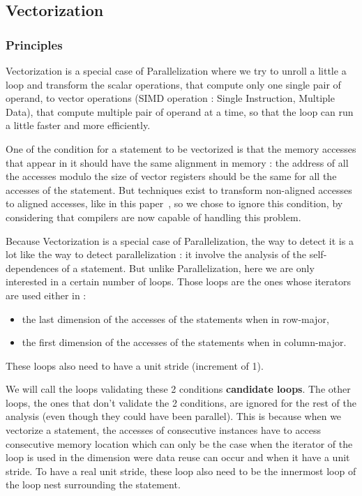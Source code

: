 \documentclass[paper=a4, fontsize=11.5pt]{scrartcl}
\numberwithin{equation}{section}        %
\numberwithin{figure}{section}          %
\numberwithin{table}{section}               %
\begin{document}
    \subsection{Vectorization}
        \subsubsection{Principles}
        Vectorization is a special case of Parallelization where we try to unroll a little
        a loop and transform the scalar operations, that compute only one single pair of
        operand, to vector operations (SIMD operation : Single Instruction, Multiple Data),
        that compute multiple pair of operand at a time, so that the loop can run a little
        faster and more efficiently.

        One of the condition for a statement to be vectorized is that the memory accesses
        that appear in it should have the same alignment in memory : the address of all the
        accesses modulo the size of vector registers should be the same for all the accesses
        of the statement.
        But techniques exist to transform non-aligned accesses to aligned accesses, like
        in this paper~\cite{Eichenberger:2004:VSA:996893.996853}, so we chose to ignore this
        condition, by considering that compilers are now capable of handling this problem.

        Because Vectorization is a special case of Parallelization, the way to detect it
        is a lot like the way to detect parallelization : it involve the analysis of
        the \glspl{self-dependence} of a statement. But unlike Parallelization, here we are
        only interested in a certain number of loops. Those loops are the ones whose iterators
        are used either in :
        \begin{itemize}
            \item the last dimension of the accesses of the statements when in row-major,
            \item the first dimension of the accesses of the statements when in column-major.
        \end{itemize}
        These loops also need to have a unit stride (increment of 1).

        We will call the loops validating these 2 conditions \textbf{candidate loops}.
        The other loops, the ones that don't validate the 2 conditions, are ignored for
        the rest of the analysis (even though they could have been parallel). This is
        because when we vectorize a statement, the accesses of consecutive instances have
        to access consecutive memory location which can only be the case when the iterator
        of the loop is used in the dimension were data reuse can occur and when it have a unit stride.
        To have a real unit stride, these loop also need to be the innermost loop of the loop nest
        surrounding the statement.
        
\end{document}
